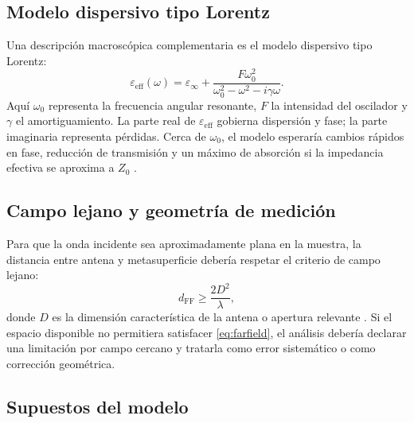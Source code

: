 \documentclass[12pt,a4paper]{article}
\begin{document}
\subsection{Modelo dispersivo tipo Lorentz}

Una descripción macroscópica complementaria es el modelo dispersivo tipo Lorentz:
\begin{equation}
  \varepsilon_{\mathrm{eff}}(\omega)=\varepsilon_\infty+
  \frac{F\omega_0^2}{\omega_0^2-\omega^2-i\gamma\omega}.
  \label{eq:lorentz}
\end{equation}
Aquí \(\omega_0\) representa la frecuencia angular resonante, \(F\) la intensidad del oscilador y \(\gamma\) el amortiguamiento. La parte real de \(\varepsilon_{\mathrm{eff}}\) gobierna dispersión y fase; la parte imaginaria representa pérdidas. Cerca de \(\omega_0\), el modelo esperaría cambios rápidos en fase, reducción de transmisión y un máximo de absorción si la impedancia efectiva se aproxima a \(Z_0\) \citep{milton2024classical,jackson1999classical}.

\subsection{Campo lejano y geometría de medición}

Para que la onda incidente sea aproximadamente plana en la muestra, la distancia entre antena y metasuperficie debería respetar el criterio de campo lejano:
\begin{equation}
  d_{\mathrm{FF}}\geq \frac{2D^2}{\lambda},
  \label{eq:farfield}
\end{equation}
donde \(D\) es la dimensión característica de la antena o apertura relevante \citep{balanis2016antenna,pozar2011microwave}. Si el espacio disponible no permitiera satisfacer \eqref{eq:farfield}, el análisis debería declarar una limitación por campo cercano y tratarla como error sistemático o como corrección geométrica.

\subsection{Supuestos del modelo}
\end{document}
